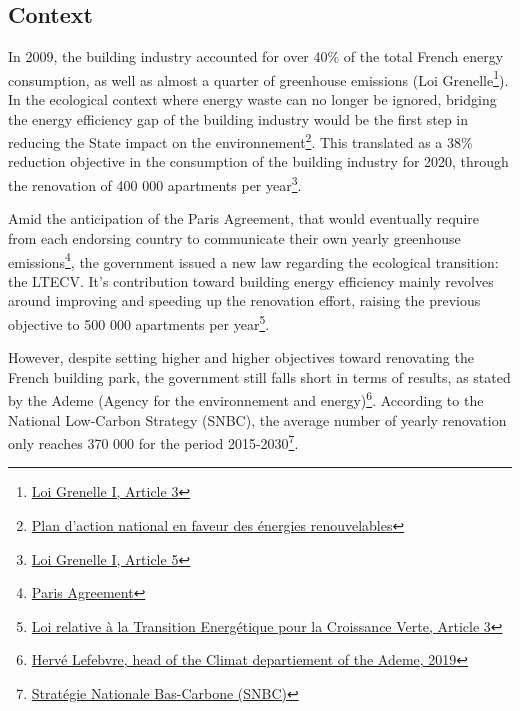 \documentclass[12pt]{article}
\begin{document}
\subsection{Context}
In 2009, the building industry accounted for over 40\% of the total French energy consumption, as well as almost a quarter of greenhouse emissions (Loi Grenelle\footnote{\href{https://www.legifrance.gouv.fr/loda/id/JORFTEXT000020949548/2020-09-21/}{Loi Grenelle I, Article 3}}). In the ecological context where energy waste can no longer be ignored, bridging the energy efficiency gap of the building industry would be the first step in reducing the State impact on the environnement\footnote{\href{http://temis.documentation.developpement-durable.gouv.fr/docs/Temis/0067/Temis-0067836/18854.pdf}{Plan d'action national en faveur des énergies renouvelables}}. This translated as a 38\% reduction objective in the consumption of the building industry for 2020, through the renovation of 400 000 apartments per year\footnote{\href{https://www.legifrance.gouv.fr/loda/id/JORFTEXT000020949548/2020-09-21/}{Loi Grenelle I, Article 5}}.

Amid the anticipation of the Paris Agreement, that would eventually require from each endorsing country to communicate their own yearly greenhouse emissions\footnote{\href{https://unfccc.int/files/meetings/paris_nov_2015/application/pdf/paris_agreement_english_.pdf}{Paris Agreement}}, the government issued a new law regarding the ecological transition: the LTECV. It's contribution toward building energy efficiency mainly revolves around improving and speeding up the renovation effort, raising the previous objective to 500 000 apartments per year\footnote{\href{https://www.legifrance.gouv.fr/jorf/id/JORFTEXT000031044385/}{Loi relative à la Transition Energétique pour la Croissance Verte, Article 3}}.

However, despite setting higher and higher objectives toward renovating the French building park, the government still falls short in terms of results, as stated by the Ademe (Agency for the environnement and energy)\footnote{\href{https://www.lefigaro.fr/conjoncture/accord-de-paris-pourquoi-les-pays-ne-sont-pas-a-la-hauteur-de-leurs-engagements-20190419}{Hervé Lefebvre, head of the Climat departiement of the Ademe, 2019}}. According to the National Low-Carbon Strategy (SNBC), the average number of yearly renovation only reaches 370 000 for the period 2015-2030\footnote{\href{https://www.ecologie.gouv.fr/strategie-nationale-bas-carbone-snbc}{Stratégie Nationale Bas-Carbone (SNBC)}}.
\end{document}
